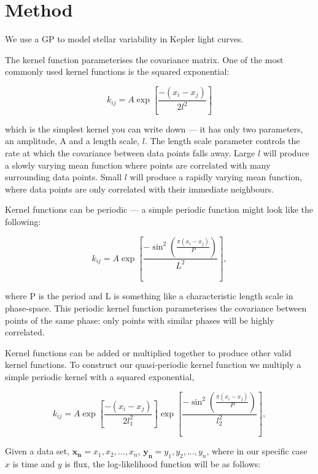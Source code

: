 \documentclass[12pt,preprint]{aastex}
\begin{document}
\section{Method}

We use a GP to model stellar variability in Kepler light curves.

The kernel function parameterises the covariance matrix.
One of the most commonly used kernel functions is the squared exponential:

\begin{equation}
	k_{ij} = A\exp\left[{\frac{-(x_i-x_j)}{2l^2}}\right]
\end{equation}

which is the simplest kernel you can write down --- it has only two parameters, an amplitude, A and a length scale, $l$.
The length scale parameter controls the rate at which the covariance between data points falls away.
Large $l$ will produce a slowly varying mean function where points are correlated with many surrounding data points.
Small $l$ will produce a rapidly varying mean function, where data points are only correlated with their immediate neighbours.

Kernel functions can be periodic --- a simple periodic function might look like the following:

\begin{equation}
	k_{ij} = A\exp\left[{\frac{-\sin^2\left({\frac{\pi(x_i-x_j)}{P}}\right)}{L^2}}\right],
\end{equation}

where P is the period and L is something like a characteristic length scale in phase-space.
This periodic kernel function parameterises the covariance between points of the same phase: only points with similar phases will be highly correlated.

Kernel functions can be added or multiplied together to produce other valid kernel functions.
To construct our quasi-periodic kernel function we multiply a simple periodic kernel with a squared exponential,

\begin{equation}
	k_{ij} = A\exp\left[{\frac{-(x_i-x_j)}{2l_1^2}}\right]\exp\left[\frac{-\sin^2\left(\frac{\pi(x_i-x_j)}{P}\right)}{l_2^2}\right],
\end{equation}

Given a data set, $\mathbf{x_n} = {x_1, x_2, ..., x_n}$, $\mathbf{y_n} = {y_1, y_2, ..., y_n}$, where in our specific case $x$ is time and $y$ is flux, the log-likelihood function will be as follows:
\end{document}
